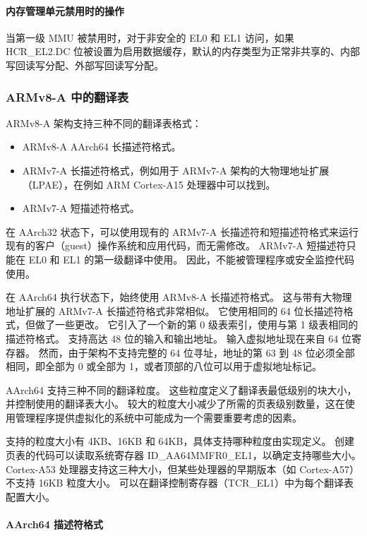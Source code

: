 \paragraph*{内存管理单元禁用时的操作}

当第一级 MMU 被禁用时，对于非安全的 EL0 和 EL1 访问，如果 HCR\_EL2.DC 位被设置为启用数据缓存，默认的内存类型为正常非共享的、内部写回读写分配、外部写回读写分配。

\subsubsection{ARMv8-A 中的翻译表}

ARMv8-A 架构支持三种不同的翻译表格式：

\begin{itemize}
\item
  ARMv8-A AArch64 长描述符格式。
\item
  ARMv7-A 长描述符格式，例如用于 ARMv7-A 架构的大物理地址扩展（LPAE），在例如 ARM Cortex-A15 处理器中可以找到。
\item
  ARMv7-A 短描述符格式。
\end{itemize}

在 AArch32 状态下，可以使用现有的 ARMv7-A 长描述符和短描述符格式来运行现有的客户（guest）操作系统和应用代码，而无需修改。
ARMv7-A 短描述符只能在 EL0 和 EL1 的第一级翻译中使用。
因此，不能被管理程序或安全监控代码使用。

在 AArch64 执行状态下，始终使用 ARMv8-A 长描述符格式。
这与带有大物理地址扩展的 ARMv7-A 长描述符格式非常相似。
它使用相同的 64 位长描述符格式，但做了一些更改。
它引入了一个新的第 0 级表索引，使用与第 1 级表相同的描述符格式。
支持高达 48 位的输入和输出地址。
输入虚拟地址现在来自 64 位寄存器。
然而，由于架构不支持完整的 64 位寻址，地址的第 63 到 48 位必须全部相同，即全部为 0 或全部为 1，或者顶部的八位可以用于虚拟地址标记。

AArch64 支持三种不同的翻译粒度。
这些粒度定义了翻译表最低级别的块大小，并控制使用的翻译表大小。
较大的粒度大小减少了所需的页表级别数量，这在使用管理程序提供虚拟化的系统中可能成为一个需要重要考虑的因素。

支持的粒度大小有 4KB、16KB 和 64KB，具体支持哪种粒度由实现定义。
创建页表的代码可以读取系统寄存器 ID\_AA64MMFR0\_EL1，以确定支持哪些大小。
Cortex-A53 处理器支持这三种大小，但某些处理器的早期版本（如 Cortex-A57）不支持 16KB 粒度大小。
可以在翻译控制寄存器（TCR\_EL1）中为每个翻译表配置大小。

\paragraph{AArch64 描述符格式}


